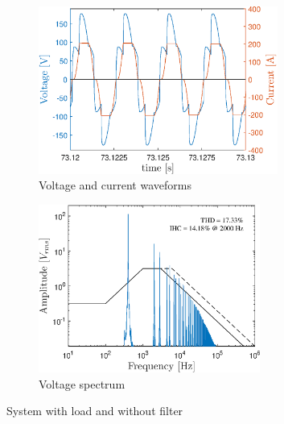 \begin{doublespacing}
	\begin{figure}[!htb] %
		\centering
		\begin{subfigure}[b]{0.5\textwidth}
			\centering
			\includegraphics[height=5.5cm]{Figures/artigo_unfilt_3.eps}
			\caption{Voltage and current waveforms} 
			\label{fig:artigo_unfilt_3.eps}
		\end{subfigure}%
		\hfill
		\begin{subfigure}[b]{0.5\textwidth}  
			\centering 
			\includegraphics[height=5.5cm]{Figures/artigo_unfilt_4.eps}
			\caption{Voltage spectrum}    
			\label{fig:artigo_unfilt_4.eps}
		\end{subfigure}%
		\caption{System with load and without filter}
		\label{fig:3}
	\end{figure}
	

\end{doublespacing}
